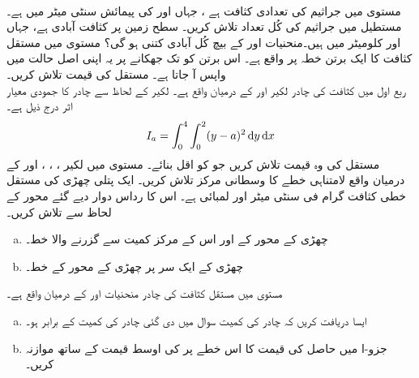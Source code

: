 \\
مستوی  میں جراثیم   کی تعدادی کثافت  ہے ، جہاں  اور  کی پیمائش  سنٹی میٹر میں ہے۔ مستطیل  میں جراثیم کی کُل تعداد تلاش کریں۔
سطح زمین پر  کثافت آبادی  ہے،  جہاں  اور  کلومیٹر میں ہیں۔منحنیات  اور  کے بیچ  کُل آبادی کتنی ہو گی؟
 مستوی  میں مستقل کثافت کا ایک برتن  خطہ  پر  واقع ہے۔ اس  برتن  کو    تک جھکانے  پر یہ اپنی اصل حالت میں واپس آ جاتا ہے۔ مستقل  کی قیمت تلاش کریں۔
\\
ربع اول میں کثافت  کی چادر  لکیر  اور  کے درمیان واقع ہے۔ لکیر  کے لحاظ سے  چادر کا جمودی معیار اثر  درج ذیل ہے۔
\begin{align*}
I_a=\int_0^4\int_0^2(y-a)^2\dif y\dif x
\end{align*}
مستقل  کی وہ قیمت تلاش کریں جو  کو اقل  بنائے۔
مستوی  میں لکیر ، ، ،  اور   کے  درمیان واقع  لامتناہی خطے  کا وسطانی مرکز تلاش کریں۔
ایک پتلی چھڑی   کی مستقل  خطی کثافت  گرام فی  سنٹی میٹر   اور لمبائی  ہے۔  اس کا رداس دوار  دیے گئے محور کے لحاظ سے تلاش کریں۔
\begin{enumerate}[a.]
\item
چھڑی کے محور کے   اور اس کے مرکز کمیت سے گزرنے والا خط۔
\item
چھڑی کے ایک سر پر چھڑی کے محور کے  خط۔ 
\end{enumerate}
مستوی  میں مستقل کثافت   کی چادر منحنیات  اور  کے درمیان واقع ہے۔
\begin{enumerate}[a.]
\item
ایسا   دریافت کریں کہ چادر کی  کمیت   سوال  میں دی گئی چادر کی کمیت کے برابر ہو۔
\item
جزو-ا میں حاصل  کی قیمت کا اس خطے پر   کی اوسط قیمت کے ساتھ موازنہ کریں۔
\end{enumerate}

